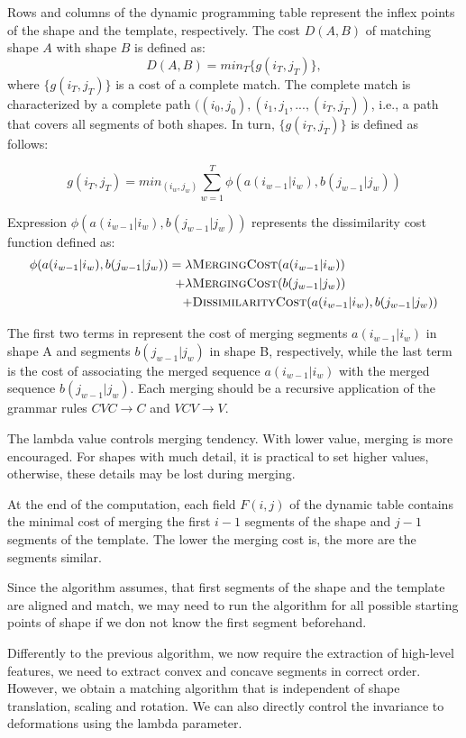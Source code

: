 Rows and columns of the dynamic programming table represent the inflex points of the shape and the template, respectively. The cost $D(A,B)$ of matching shape $A$ with shape $B$ is defined as:
\[ D(A,B) = min_{T} \{g(i_T,j_T)\}, \]
where $\{g(i_T,j_T)\}$ is a cost of a complete match. The complete match is characterized by a complete path $((i_{0},j_{0}),(i_{1},j_{1}, ..., (i_{T},j_{T}))$, i.e., a path that covers all segments of both shapes. In turn, $\{g(i_T,j_T)\}$ is defined as follows:

\[
g(i_{T},j_{T}) = min_(i_w,j_w) \sum_{w=1}^{T} \phi(a(i_{w-1}|i_{w}), b(j_{w-1}|j_{w}))
\]

Expression $\phi(a(i_{w-1}|i_{w}), b(j_{w-1}|j_{w}))$ represents the dissimilarity cost function defined as: 
\begin{align*}
\phi(a(i_{w-1}|i_{w}), b(j_{w-1}|j_{w}))  = \lambda & \textsc{MergingCost}(a(i_{w-1}|i_{w})) \\
+ \lambda & \textsc{MergingCost}(b(j_{w-1}|j_{w})) \\
+ &\textsc{DissimilarityCost}(a(i_{w-1}|i_{w}), b(j_{w-1}|j_{w}))
\end{align*}

The first two terms in represent the cost of merging segments $a(i_{w-1}|i_{w})$ in shape A and segments $b(j_{w-1}|j_{w})$ in shape B, respectively, while the last term is the cost of associating the merged sequence $a(i_{w-1}|i_{w})$ with the merged sequence $b(j_{w-1}|j_{w})$. Each merging should be a recursive application of the grammar rules  $CVC \to C$ and $VCV \to V$.

The lambda value controls merging tendency. With lower value, merging is more encouraged. For shapes with much detail, it is practical to set higher values, otherwise, these details may be lost during merging. 

At the end of the computation, each field $F(i,j)$ of the dynamic table contains the minimal cost of merging the first $i-1$ segments of the shape and $j-1$ segments of the template. The lower the merging cost is, the more are the segments similar. 

Since the algorithm assumes, that first segments of the shape and the template are aligned and match, we may need to run the algorithm for all possible starting points of shape if we don not know the first segment beforehand.

Differently to the previous algorithm, we now require the extraction of high-level features, we need to extract convex and concave segments in correct order. However, we obtain a matching algorithm that is independent of shape translation, scaling and rotation. We can also directly control the invariance to deformations using the lambda parameter.

